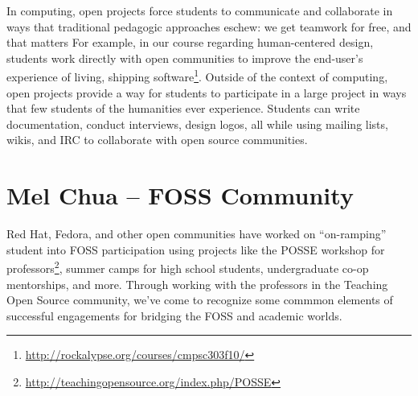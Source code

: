 \documentclass{sig-alternate}
\begin{document}
In computing, open projects force students to communicate and collaborate in ways that traditional pedagogic approaches eschew: we get teamwork for free, and that matters%
For example, in our course regarding human-centered design, students work directly with open communities to improve the end-user's experience of living, shipping software\footnote{\url{http://rockalypse.org/courses/cmpsc303f10/}}. %
Outside of the context of computing, open projects provide a way for students to participate in a large project in ways that few students of the humanities ever experience. %
Students can write documentation, conduct interviews, design logos, all while using mailing lists, wikis, and IRC to collaborate with %
open source communities. %


\begin{comment}       
       
	
	
* [1] [[BegelBibTexChooseOne|Begel BibTeX]]
* [2] http://rockalypse.org/blogs/flyinggator/
* [3] http://concurrency.cc/book/
* [4] http://rockalypse.org/courses/cmpsc303f10/
* [5] http://fedoraproject.org/wiki/Allegheny_Activism_And_Fedora
* [6] http://rockalypse.org/courses/fs101f10/
* [7] [[LPPBibTeX|Lave & Wenger BibTeX]]
\end{comment}

\section{Mel Chua -- FOSS Community}

Red Hat, Fedora, and other open communities have worked on ``on-ramping'' student into FOSS participation using projects like the POSSE workshop for professors\footnote{\url{http://teachingopensource.org/index.php/POSSE}}, summer camps for high school students, undergraduate co-op mentorships, and more.  %
 Through working with the professors in the Teaching Open Source community, we've come to recognize some commmon elements of successful engagements for bridging the FOSS and academic worlds.
\end{document}
